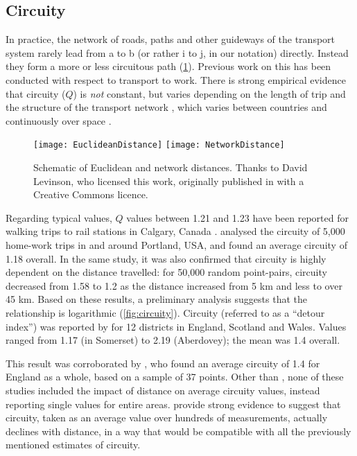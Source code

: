 \subsection{Circuity} \label{scircuity}   
In practice, the
network of roads, paths and other guideways of the transport system
rarely lead from a to b (or rather
i to j, in our notation) directly. Instead they
form a more or less circuitous path (\cref{fig:routes}). Previous work on this has
been conducted with respect to transport to work. There is strong empirical
evidence that circuity ($Q$) is \emph{not} constant, but varies depending on
the length of trip \citep{Levinson2009} and the structure of the transport
network \citep{parthasarathi2012network}, which varies between countries
\citep{Ballou2002} and continuously over space \citep{Barthelemy2011}.

\begin{figure}[h]
 \centering
 \texttt{[image: EuclideanDistance]}
  \texttt{[image: NetworkDistance]}
 \caption[Schematic of Euclidean and network distances]{Schematic of
 Euclidean and network distances. Thanks to David Levinson, who licensed this
 work, originally published in \citet{Levinson2009} with a Creative Commons licence.}
 \label{fig:routes}
\end{figure}

Regarding
typical values, $Q$ values between 1.21 and 1.23 have been reported for
walking trips to rail stations in Calgary, Canada \citep{O'Sullivan1996}.
\citet{Levinson2009} analysed the circuity of 5,000 home-work trips in and
around Portland, USA, and found an average circuity of 1.18 overall. In the
same study, it was also confirmed that
circuity is highly dependent on the distance travelled: for 50,000 random
point-pairs, circuity decreased from 1.58 to 1.2 as the distance increased from
5 km and less to over 45 km. Based on these results, a preliminary analysis
suggests that the relationship is logarithmic (\cref{fig:circuity}).
Circuity (referred to as a ``detour index'') was reported by \citet[p.~565]{cole1968quantitative}
for 12 districts in England, Scotland and Wales. Values ranged from
1.17 (in Somerset) to 2.19 (Aberdovey); the mean was 1.4 overall.

This result was corroborated by \citet{Ballou2002}, who
found an average circuity of 1.4 for England
as a whole, based on a sample of 37 points. Other than \citet{Levinson2009},
none of these studies
included the impact of distance on average circuity
values, instead reporting single values for entire areas.
\citet{Levinson2009} provide strong evidence to suggest that
circuity, taken as an average value over hundreds of measurements,
actually declines with distance, in a way that would be compatible
with all the previously mentioned estimates of circuity.

